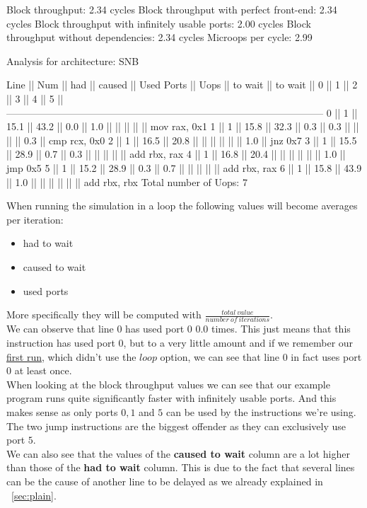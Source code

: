 \begin{example}
Block throughput: 2.34 cycles
Block throughput with perfect front-end: 2.34 cycles
Block throughput with infinitely usable ports: 2.00 cycles
Block throughput without dependencies: 2.34 cycles
Microops per cycle: 2.99

Analysis for architecture: SNB

 Line  ||   Num   ||   had   || caused  ||            Used Ports
       ||   Uops  || to wait || to wait ||   0   ||   1   ||   2   ||   3   ||   4   ||   5   ||
 ------------------------------------------------------------------------------------------------
   0   ||    1    ||  15.1   ||  43.2   ||  0.0  ||  1.0  ||       ||       ||       ||       || mov rax, 0x1
   1   ||    1    ||  15.8   ||  32.3   ||  0.3  ||  0.3  ||       ||       ||       ||  0.3  || cmp rcx, 0x0
   2   ||    1    ||  16.5   ||  20.8   ||       ||       ||       ||       ||       ||  1.0  || jnz 0x7
   3   ||    1    ||  15.5   ||  28.9   ||  0.7  ||  0.3  ||       ||       ||       ||       || add rbx, rax
   4   ||    1    ||  16.8   ||  20.4   ||       ||       ||       ||       ||       ||  1.0  || jmp 0x5
   5   ||    1    ||  15.2   ||  28.9   ||  0.3  ||  0.7  ||       ||       ||       ||       || add rbx, rax
   6   ||    1    ||  15.8   ||  43.9   ||  1.0  ||       ||       ||       ||       ||       || add rbx, rbx
Total number of Uops: 7
\end{example}

When running the simulation in a loop the following values will become averages per iteration:

\begin{itemize}
    \item had to wait
    \item caused to wait
    \item used ports
\end{itemize} 

More specifically they will be computed with $\frac{total\ value}{number\ of\ iterations}$.\\
We can observe that line $0$ has used port $0$ $0.0$ times. This just means that this instruction has used port $0$, but to a very little amount and if we remember our \hyperref[sec:plain]{first run}, which didn't use the $loop$ option, we can see that line $0$ in fact uses port $0$ at least once.\\
When looking at the block throughput values we can see that our example program runs quite significantly faster with infinitely usable ports. And this makes sense as only ports $0, 1$ and $5$ can be used by the instructions we're using. The two jump instructions are the biggest offender as they can exclusively use port $5$.\\
We can also see that the values of the \textbf{caused to wait} column are a lot higher than those of the \textbf{had to wait} column. This is due to the fact that several lines can be the cause of another line to be delayed as we already explained in ~\autoref{sec:plain}.

